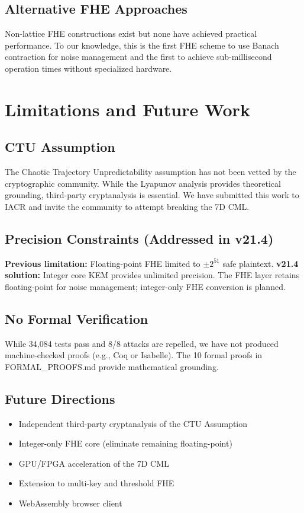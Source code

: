 \documentclass[11pt,a4paper]{article}
\begin{document}
\subsection{Alternative FHE Approaches}
Non-lattice FHE constructions exist but none have achieved practical performance. To our knowledge, this is the first FHE scheme to use Banach contraction for noise management and the first to achieve sub-millisecond operation times without specialized hardware.

\section{Limitations and Future Work}

\subsection{CTU Assumption}
The Chaotic Trajectory Unpredictability assumption has not been vetted by the cryptographic community. While the Lyapunov analysis provides theoretical grounding, third-party cryptanalysis is essential. We have submitted this work to IACR and invite the community to attempt breaking the 7D CML.

\subsection{Precision Constraints (Addressed in v21.4)}
\textbf{Previous limitation:} Floating-point FHE limited to $\pm 2^{51}$ safe plaintext. \textbf{v21.4 solution:} Integer core KEM provides unlimited precision. The FHE layer retains floating-point for noise management; integer-only FHE conversion is planned.

\subsection{No Formal Verification}
While 34,084 tests pass and 8/8 attacks are repelled, we have not produced machine-checked proofs (e.g., Coq or Isabelle). The 10 formal proofs in FORMAL\_PROOFS.md provide mathematical grounding.

\subsection{Future Directions}
\begin{itemize}
\item Independent third-party cryptanalysis of the CTU Assumption
\item Integer-only FHE core (eliminate remaining floating-point)
\item GPU/FPGA acceleration of the 7D CML
\item Extension to multi-key and threshold FHE
\item WebAssembly browser client
\end{itemize}
\end{document}
